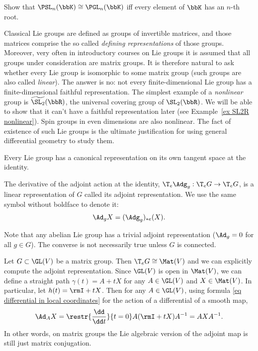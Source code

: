 \begin{xca}\label{xca psl=pgl}
    Show that $\PSL_n(\bbK)\cong \PGL_n(\bbK)$ iff every element of $\bbK$ has an $n$-th root.
\end{xca}

\begin{rem}
    Classical Lie groups are defined as groups of invertible matrices, and those matrices comprise the so called \emph{defining representations} of those groups. Moreover, very often in introductory courses on Lie groups it is assumed that all groups under consideration are matrix groups. It is therefore natural to ask whether every Lie group is isomorphic to some matrix group (such groups are also called \emph{linear}). The answer is no: not every finite-dimensional Lie group has a finite-dimensional faithful representation. The simplest example of a \emph{nonlinear} group is $\widetilde{\SL_2}(\bbR)$, the universal covering group of $\SL_2(\bbR)$.  We will be able to show that it can't have a faithful representation later (see Example~\ref{ex SL2R nonlinear}). Spin groups in even dimensions are also nonlinear. The fact of existence of such Lie groups is the ultimate justification for using general differential geometry to study them.
\end{rem}

Every Lie group has a canonical representation on its own tangent space at the identity.

\begin{defn}
    The derivative of the adjoint action at the identity, $\T_e\Adg_g:\T_e G\to \T_e G$, is a linear representation of $G$ called its adjoint representation. We use the same symbol without boldface to denote it:
    \[\Ad_g X=(\Adg_g)_{\ast e}(X).\]
\end{defn}

Note that any abelian Lie group has a trivial adjoint representation ($\Ad_g=0$ for all $g\in G$). The converse is not necessarily true unless $G$ is connected.

\begin{example}
    Let $G\subset \GL(V)$ be a matrix group. Then $\T_e G\cong \Mat(V)$ and we can explicitly compute the adjoint representation. Since $\GL(V)$ is open in $\Mat(V)$, we can define a straight path $\gamma(t)=A+tX$ for any $A\in \GL(V)$ and $X\in \Mat(V)$. In particular, let $h(t)=\rmI+tX$. Then for any $A\in \GL(V)$, using formula \eqref{eq differential in local coordinates} for the action of a differential of a smooth map,
    \[\Ad_A X=\restr{\frac{\dd}{\dd t}}{t=0}A(\rmI+tX)A^{-1}=AXA^{-1}.\]
    In other words, on matrix groups the Lie algebraic version of the adjoint map is still just matrix conjugation.
\end{example}







